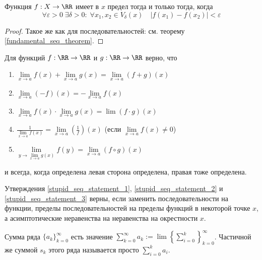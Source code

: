 \documentclass[12pt,a4paper]{article}
\begin{document}
    \begin{statement}
        Функция $f: X \to \RR$ имеет в $x$ предел тогда и только тогда, когда
        \[\forall \varepsilon > 0\; \exists \delta > 0:\; \forall x_1, x_2 \in V_\delta(x)\quad |f(x_1) - f(x_2)| < \varepsilon\]
    \end{statement}

    \begin{proof}
        Такое же как для последовательностей: см. теорему \ref{fundamental_seq_theorem}.
    \end{proof}

    \begin{statement}
        Для функций $f: \RR \to \RR$ и $g: \RR \to \RR$ верно, что
        \begin{enumerate}
            \item $\lim\limits_{x \to a} f(x) + \lim\limits_{x \to a} g(x) = \lim\limits_{x \to a} (f + g)(x)$
            \item $\lim\limits_{x \to a} (-f)(x) = -\lim\limits_{x \to a} f(x)$
            \item $\lim\limits_{x \to a} f(x) \cdot \lim\limits_{x \to a} g(x) = \lim (f \cdot g)(x)$
            \item $\frac{1}{\lim\limits_{x \to a} f(x)} = \lim\limits_{x \to a} (\frac{1}{f})(x)$ (если $\lim\limits_{x \to a} f(x) \neq 0$)
            \item $\lim\limits_{y \to \lim\limits_{x \to a} g(x)} f(y) = \lim\limits_{x \to a} (f \circ g)(x)$
        \end{enumerate}
        и всегда, когда определена левая сторона определена, правая тоже определена.
    \end{statement}

    \begin{remark}
        Утверждения \ref{stupid_seq_statement_1}, \ref{stupid_seq_statement_2} и \ref{stupid_seq_statement_3} верны, если заменить последовательности на функции, пределы последовательностей на пределы функций в некоторой точке $x$, а асимптотические неравенства на неравенства на окрестности $x$.
    \end{remark}

    \begin{definition}
        Сумма ряда $\{a_k\}_{k=0}^\infty$ есть значение $\sum_{k=0}^\infty a_k := \lim \left\{\sum_{i=0}^k\right\}_{k=0}^\infty$. Частичной же суммой $s_k$ этого ряда называется просто $\sum_{i=0}^k a_i$.
    \end{definition}
\end{document}
